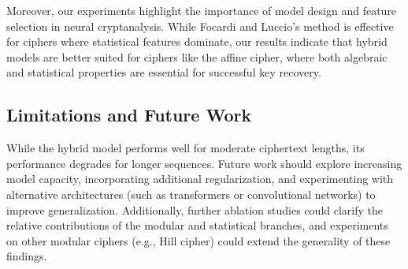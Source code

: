 \documentclass[manuscript,screen,acmtog,natbib=false]{acmart}
\begin{document}
  Moreover, our experiments highlight the importance of model design and feature selection in neural cryptanalysis. While Focardi and Luccio's method is effective for ciphers where statistical features
  dominate, our results indicate that hybrid models are better suited for ciphers like the affine cipher, where both algebraic and statistical properties are essential for successful key recovery.

  \subsection{Limitations and Future Work}

  While the hybrid model performs well for moderate ciphertext lengths, its performance degrades for longer sequences.
  Future work should explore increasing model capacity, incorporating additional regularization, and experimenting with alternative
  architectures (such as transformers or convolutional networks) to improve generalization. Additionally, further ablation studies could clarify
  the relative contributions of the modular and statistical branches, and experiments on other modular ciphers (e.g., Hill cipher) could extend the generality of these findings.



  \printbibliography
  
\end{document}
